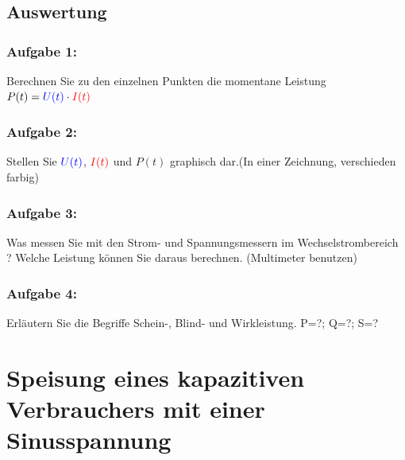 \documentclass[11pt,a4paper,titlepage,parskip=half]{scrreprt}
\begin{document}
            
            \subsection{Auswertung}
                \subsubsection{Aufgabe 1:}  Berechnen Sie zu den einzelnen Punkten die momentane Leistung $P(t) = \textcolor{blue}{U(t)} \cdot \textcolor{red}{I(t)}$ 

                \subsubsection{Aufgabe 2:}   Stellen Sie $\textcolor{blue}{U(t)}$, $\textcolor{red}{I(t)}$ und $P(t)$ graphisch dar.(In einer Zeichnung, verschieden farbig)
                
                \subsubsection{Aufgabe 3:}  Was messen Sie mit den Strom- und Spannungsmessern im Wechselstrombereich ? Welche Leistung können Sie daraus berechnen. (Multimeter benutzen)
               
                \subsubsection{Aufgabe 4:}   Erläutern Sie die Begriffe Schein-, Blind- und Wirkleistung.   P=?; Q=?; S=?
      
                         
                         
                
                 
        \section{Speisung eines kapazitiven Verbrauchers mit einer Sinusspannung}
\end{document}
